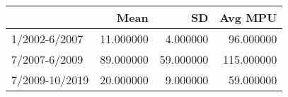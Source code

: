 \begin{tabular}{lrrr}
\toprule
 & Mean & SD & Avg MPU \\
\midrule
1/2002-6/2007 & 11.000000 & 4.000000 & 96.000000 \\
7/2007-6/2009 & 89.000000 & 59.000000 & 115.000000 \\
7/2009-10/2019 & 20.000000 & 9.000000 & 59.000000 \\
\bottomrule
\end{tabular}
